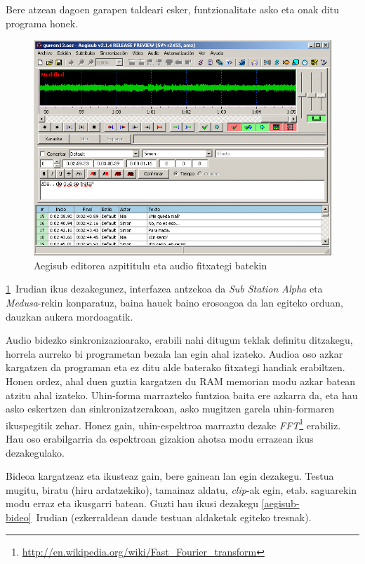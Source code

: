 Bere atzean dagoen garapen taldeari esker, funtzionalitate asko eta onak ditu programa honek.

\begin{figure}[htbp]
\begin{center}
\includegraphics[width=\columnwidth, natwidth=725pt, natheight=525pt]{Pictures/Chapter2/aegisub-audio.png}
\caption{Aegisub editorea azpititulu eta audio fitxategi batekin}
\label{aegisub-audio}
\end{center}
\end{figure}

\ref{aegisub-audio}~Irudian ikus dezakegunez, interfazea antzekoa da \textit{Sub Station Alpha} eta \textit{Medusa}-rekin konparatuz, baina hauek baino erosoagoa da lan egiteko orduan, dauzkan aukera mordoagatik.

Audio bidezko sinkronizazioarako, erabili nahi ditugun teklak definitu ditzakegu, horrela aurreko bi programetan bezala lan egin ahal izateko. Audioa oso azkar kargatzen da programan eta ez ditu alde baterako fitxategi handiak erabiltzen. Honen ordez, ahal duen guztia kargatzen du RAM memorian modu azkar batean atzitu ahal izateko. Uhin-forma marrazteko funtzioa baita ere azkarra da, eta hau asko eskertzen dan sinkronizatzerakoan, asko mugitzen garela uhin-formaren ikuspegitik zehar. Honez gain, uhin-espektroa marraztu dezake \textit{FFT}\footnote{\url{http://en.wikipedia.org/wiki/Fast_Fourier_transform}} erabiliz. Hau oso erabilgarria da espektroan gizakion ahotsa modu errazean ikus dezakegulako.

Bideoa kargatzeaz eta ikusteaz gain, bere gainean lan egin dezakegu. Testua mugitu, biratu (hiru ardatzekiko), tamainaz aldatu, \textit{clip}-ak egin, etab. saguarekin modu erraz eta ikusgarri batean. Guzti hau ikusi dezakegu \ref{aegisub-bideo}~Irudian (ezkerraldean daude testuan aldaketak egiteko tresnak).

